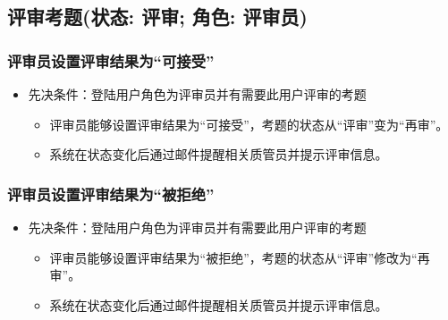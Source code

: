 \documentclass[hyperref, a4paper]{ctexart}
\providecommand{\tightlist}{%
  \setlength{\itemsep}{0pt}\setlength{\parskip}{0pt}}
\begin{document}
\hypertarget{ux8bc4ux5ba1ux8003ux9898ux72b6ux6001-ux8bc4ux5ba1-ux89d2ux8272-ux8bc4ux5ba1ux5458}{%
\subsection{评审考题(状态: 评审; 角色:
评审员)}\label{ux8bc4ux5ba1ux8003ux9898ux72b6ux6001-ux8bc4ux5ba1-ux89d2ux8272-ux8bc4ux5ba1ux5458}}

\hypertarget{ux8bc4ux5ba1ux5458ux8bbeux7f6eux8bc4ux5ba1ux7ed3ux679cux4e3aux53efux63a5ux53d7}{%
\subsubsection{评审员设置评审结果为``可接受''}\label{ux8bc4ux5ba1ux5458ux8bbeux7f6eux8bc4ux5ba1ux7ed3ux679cux4e3aux53efux63a5ux53d7}}

\begin{itemize}
\tightlist
\item
  先决条件：登陆用户角色为评审员并有需要此用户评审的考题

  \begin{itemize}
  \tightlist
  \item
    评审员能够设置评审结果为``可接受''，考题的状态从``评审''变为``再审''。
  \item
    系统在状态变化后通过邮件提醒相关质管员并提示评审信息。
  \end{itemize}
\end{itemize}

\hypertarget{ux8bc4ux5ba1ux5458ux8bbeux7f6eux8bc4ux5ba1ux7ed3ux679cux4e3aux88abux62d2ux7edd}{%
\subsubsection{评审员设置评审结果为``被拒绝''}\label{ux8bc4ux5ba1ux5458ux8bbeux7f6eux8bc4ux5ba1ux7ed3ux679cux4e3aux88abux62d2ux7edd}}

\begin{itemize}
\tightlist
\item
  先决条件：登陆用户角色为评审员并有需要此用户评审的考题

  \begin{itemize}
  \tightlist
  \item
    评审员能够设置评审结果为``被拒绝''，考题的状态从``评审''修改为``再审''。
  \item
    系统在状态变化后通过邮件提醒相关质管员并提示评审信息。
  \end{itemize}
\end{itemize}
\end{document}
